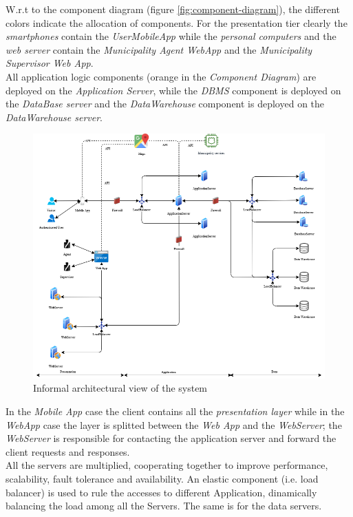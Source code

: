 \documentclass[a4paper]{report}
\begin{document}
W.r.t to the component diagram (figure \ref{fig:component-diagram}), the different colors indicate the allocation of components.
For the presentation tier clearly the \textit{smartphones} contain the \textit{UserMobileApp} while the \textit{personal computers} and the \textit{web server} contain the \textit{Municipality Agent WebApp} and the \textit{Municipality Supervisor Web App}.\\
All application logic components (orange in the \textit{Component Diagram}) are deployed on the \textit{Application Server}, while the \textit{DBMS} component is deployed on the \textit{DataBase server} and the \textit{DataWarehouse} component is deployed on the \textit{DataWarehouse server}.

\begin{figure}[htp]
\includegraphics[scale=0.55]{SystemArchitecture}
\caption{Informal architectural view of the system}
\label{fig:architecture-diagram}
\end{figure}
In the \textit{Mobile App} case the client contains all the \textit{presentation layer} while in the \textit{WebApp} case the layer is splitted between the \textit{Web App} and the \textit{WebServer}; the \textit{WebServer} is responsible for contacting the application server and forward the client requests and responses.\\
All the servers are multiplied, cooperating together to improve performance, scalability, fault tolerance and availability. An elastic component (i.e. load balancer) is used to rule the accesses to different Application, dinamically balancing the load among all the Servers. The same is for the data servers.
\end{document}
